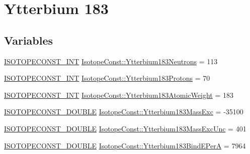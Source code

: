 \hypertarget{group___isotope_const-_ytterbium-_yb183}{}\section{Ytterbium 183}
\label{group___isotope_const-_ytterbium-_yb183}
\subsection*{Variables}
\begin{DoxyCompactItemize}
\item 
\mbox{\hyperlink{group___isotope_const-_macros_ga5f18360b3e99483a35c32d789e62621c}{I\+S\+O\+T\+O\+P\+E\+C\+O\+N\+S\+T\+\_\+\+I\+NT}} \mbox{\hyperlink{group___isotope_const-_ytterbium-_yb183_ga204c39fe0a41703b62b29cb77ce6e060}{Isotope\+Const\+::\+Ytterbium183\+Neutrons}} = 113
\item 
\mbox{\hyperlink{group___isotope_const-_macros_ga5f18360b3e99483a35c32d789e62621c}{I\+S\+O\+T\+O\+P\+E\+C\+O\+N\+S\+T\+\_\+\+I\+NT}} \mbox{\hyperlink{group___isotope_const-_ytterbium-_yb183_ga612e9493f367179e0bd6ec8e9e386e7f}{Isotope\+Const\+::\+Ytterbium183\+Protons}} = 70
\item 
\mbox{\hyperlink{group___isotope_const-_macros_ga5f18360b3e99483a35c32d789e62621c}{I\+S\+O\+T\+O\+P\+E\+C\+O\+N\+S\+T\+\_\+\+I\+NT}} \mbox{\hyperlink{group___isotope_const-_ytterbium-_yb183_gabed65fff693d87d604ae75bef7015bd2}{Isotope\+Const\+::\+Ytterbium183\+Atomic\+Weight}} = 183
\item 
\mbox{\hyperlink{group___isotope_const-_macros_ga8f45a7272ce02c0b4c65c44636ed719a}{I\+S\+O\+T\+O\+P\+E\+C\+O\+N\+S\+T\+\_\+\+D\+O\+U\+B\+LE}} \mbox{\hyperlink{group___isotope_const-_ytterbium-_yb183_gabc5805ba17156e7b3b5dff13d9fcd946}{Isotope\+Const\+::\+Ytterbium183\+Mass\+Exc}} = -\/35100
\item 
\mbox{\hyperlink{group___isotope_const-_macros_ga8f45a7272ce02c0b4c65c44636ed719a}{I\+S\+O\+T\+O\+P\+E\+C\+O\+N\+S\+T\+\_\+\+D\+O\+U\+B\+LE}} \mbox{\hyperlink{group___isotope_const-_ytterbium-_yb183_ga5d418499a9c7c81e3e7b04a49d10ccd2}{Isotope\+Const\+::\+Ytterbium183\+Mass\+Exc\+Unc}} = 401
\item 
\mbox{\hyperlink{group___isotope_const-_macros_ga8f45a7272ce02c0b4c65c44636ed719a}{I\+S\+O\+T\+O\+P\+E\+C\+O\+N\+S\+T\+\_\+\+D\+O\+U\+B\+LE}} \mbox{\hyperlink{group___isotope_const-_ytterbium-_yb183_ga18dcfa6299ffe1a97eec1048f64181de}{Isotope\+Const\+::\+Ytterbium183\+Bind\+E\+PerA}} = 7964
\item 

\end{DoxyCompactItemize}
